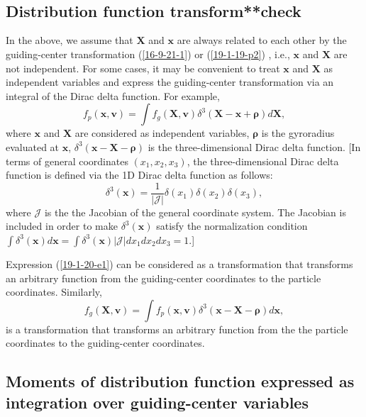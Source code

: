 \documentclass{llncs}
\newcommand{\tmmathbf}[1]{\ensuremath{\boldsymbol{#1}}}
\begin{document}
\

\

\subsection{Distribution function transform**check}

In the above, we assume that $\mathbf{X}$ and $\mathbf{x}$ are always related
to each other by the guiding-center transformation (\ref{16-9-21-1}) or
(\ref{19-1-19-p2}) , i.e., $\mathbf{x}$ and $\mathbf{X}$ are not independent.
For some cases, it may be convenient to treat $\mathbf{x}$ and $\mathbf{X}$ as
independent variables and express the guiding-center transformation via an
integral of the Dirac delta function. For example,
\begin{equation}
  \label{19-1-20-e1} f_p (\mathbf{x}, \mathbf{v}) = \int f_g (\mathbf{X},
  \mathbf{v}) \delta^3 (\mathbf{X}-\mathbf{x}+\tmmathbf{\rho}) d\mathbf{X},
\end{equation}
where $\mathbf{x}$ and $\mathbf{X}$ are considered as independent variables,
$\tmmathbf{\rho}$ is the gyroradius evaluated at $\mathbf{x}$, $\delta^3
(\mathbf{x}-\mathbf{X}-\tmmathbf{\rho})$ is the three-dimensional Dirac delta
function. [In terms of general coordinates $(x_1, x_2, x_3)$, the
three-dimensional Dirac delta function is defined via the 1D Dirac delta
function as follows:
\begin{equation}
  \delta^3 (\mathbf{x}) = \frac{1}{| \mathcal{J} |} \delta (x_1) \delta (x_2)
  \delta (x_3),
\end{equation}
where $\mathcal{J}$ is the the Jacobian of the general coordinate system. The
Jacobian is included in order to make $\delta^3 (\mathbf{x})$ satisfy the
normalization condition $\int \delta^3 (\mathbf{x}) d\mathbf{x}= \int \delta^3
(\mathbf{x}) | \mathcal{J} | d x_1 d x_2 d x_3 = 1$.]

Expression (\ref{19-1-20-e1}) can be considered as a transformation that
transforms an arbitrary function from the guiding-center coordinates to the
particle coordinates. Similarly,
\begin{equation}
  f_g (\mathbf{X}, \mathbf{v}) = \int f_p (\mathbf{x}, \mathbf{v}) \delta^3
  (\mathbf{x}-\mathbf{X}-\tmmathbf{\rho}) d\mathbf{x},
\end{equation}
is a transformation that transforms an arbitrary function from the the
particle coordinates to the guiding-center coordinates.

\subsection{Moments of distribution function expressed as integration over
guiding-center variables}
\end{document}

